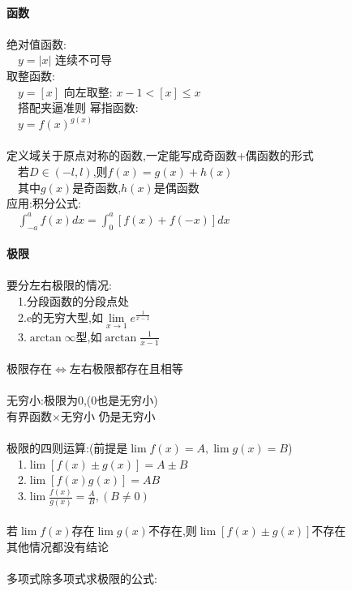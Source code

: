 \documentclass{article}
\begin{document}
\begin{flushleft}
	\fontsize{24pt}{30pt}\selectfont
	~\\ \textbf{函数}\\~\\
	绝对值函数:\\
	\ \ $y=\vert x\vert$ 连续不可导\\
	取整函数:\\
	\ \ $y=[x]$ 向左取整: $x-1<[x]\leq x$\\
	\ \ 搭配夹逼准则
	幂指函数:\\
	\ \ $y=f(x)^{g(x)}$\\
	~\\
	定义域关于原点对称的函数,一定能写成奇函数+偶函数的形式\\
	\ \ 若$D\in (-l,l)$,则$f(x)=g(x)+h(x)$\\
	\ \ 其中$g(x)$是奇函数,$h(x)$是偶函数\\
	应用:积分公式:\\
	\ \ $\int_{-a}^a f(x)dx=\int_0^a [f(x)+f(-x)]dx$\\
	~\\ \textbf{极限}\\~\\
	要分左右极限的情况:\\
	\ \ 1.分段函数的分段点处\\
	\ \ 2.e的无穷大型,如$\lim\limits_{x\to 1} e^{\frac{1}{x-1}}$\\
	\ \ 3.$\arctan\infty$型,如$\arctan{\frac{1}{x-1}}$\\
	~\\
	极限存在$\Leftrightarrow$左右极限都存在且相等\\
	~\\
	无穷小:极限为0,(0也是无穷小)\\
	有界函数$\times$无穷小 仍是无穷小\\
	~\\
	极限的四则运算:(前提是$\lim f(x)=A,\lim g(x)=B$)\\
	\ \ 1.$\lim [f(x)\pm g(x)]=A\pm B$\\
	\ \ 2.$\lim [f(x)g(x)]=AB$\\
	\ \ 3.$\lim \frac{f(x)}{g(x)} =\frac{A}{B},(B\neq 0)$\\
	~\\
	若$\lim f(x)$存在$\lim g(x)$不存在,则$\lim [f(x)\pm g(x)]$不存在\\
	其他情况都没有结论\\
	~\\
	多项式除多项式求极限的公式:\\

\end{flushleft}
\end{document}

